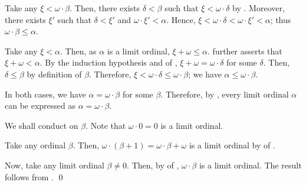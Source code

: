 \documentclass[../introduction_to_set_theory_Note.tex]{subfiles}
\begin{document}
{\begin{itemize}[nolistsep, wide=0pt, widest={(\(\Rightarrow\))}, leftmargin=*, listparindent=\parindent]
\begin{itemize}[nolistsep, leftmargin=*, listparindent=\parindent]
        Take any \(\xi < \omega \cdot \beta\).
        Then, there exists \(\delta < \beta\) such that \(\xi < \omega \cdot \delta\)
        by .
        Moreover, there exists \(\xi'\) such that \(\delta < \xi'\) and \(\omega \cdot \xi' < \alpha\).
        Hence, \(\xi < \omega \cdot \delta < \omega \cdot \xi' < \alpha\);
        thus \(\omega \cdot \beta \le \alpha\).

        Take any \(\xi < \alpha\).
        Then, as \(\alpha\) is a limit ordinal, \(\xi + \omega \le \alpha\).
         further asserts that \(\xi + \omega < \alpha\).
        By the induction hypothesis and  of ,
        \(\xi + \omega = \omega \cdot \delta\) for some \(\delta\).
        Then, \(\delta \le \beta\) by definition of \(\beta\).
        Therefore, \(\xi < \omega \cdot \delta \le \omega \cdot \beta\);
        we have \(\alpha \le \omega \cdot \beta\).
    \end{itemize}
    In both cases, we have \(\alpha = \omega \cdot \beta\) for some \(\beta\).
    Therefore, by ,
    every limit ordinal \(\alpha\) can be expressed as
    \(\alpha = \omega \cdot \beta\).

    \ii[(\(\Leftarrow\))]
    We shall conduct  on \(\beta\).
    Note that \(\omega \cdot 0 = 0\) is a limit ordinal.

    Take any ordinal \(\beta\).
    Then, \(\omega \cdot (\beta + 1) = \omega \cdot \beta + \omega\)
    is a limit ordinal by  of .

    Now, take any limit ordinal \(\beta \neq 0\).
    Then, by  of ,
    \(\omega \cdot \beta\) is a limit ordinal.
    The result follows from .
    \qed
\end{itemize}
}

\end{document}

